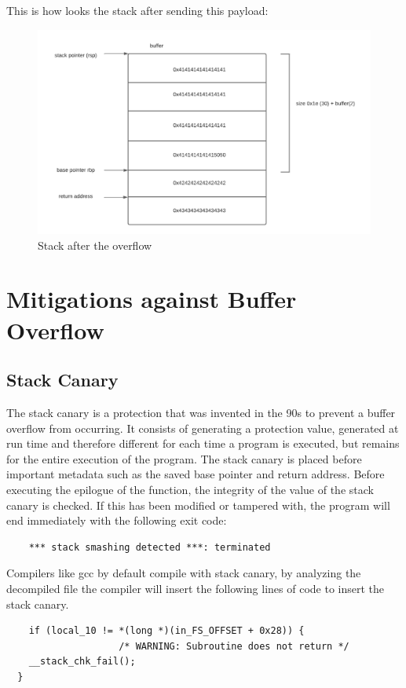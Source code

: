 \documentclass{report}
\begin{document}
    This is how looks the stack after sending this payload:
    \begin{figure}
        \centering
        \includegraphics[width=1\linewidth]{stack_after_overflow.png}
        \caption{Stack after the overflow}
        \label{fig:enter-label}
    \end{figure}
    \clearpage
    
    \chapter{Mitigations against Buffer Overflow}
    \section{Stack Canary}
    The stack canary is a protection that was invented in the 90s to prevent a buffer overflow from occurring.
    It consists of generating a protection value, generated at run time and therefore different for each time a program is executed, but remains for the entire execution of the program.
    The stack canary is placed before important metadata such as the saved base pointer and return address.
    Before executing the epilogue of the function, the integrity of the value of the stack canary is checked. If this has been modified or tampered with, the program will end immediately with the following exit code:
    \begin{verbatim}
    *** stack smashing detected ***: terminated
    \end{verbatim}
    
    Compilers like gcc by default compile with stack canary, by analyzing the decompiled file the compiler will insert the following lines of code to insert the stack canary.\newline
    \begin{verbatim}
    if (local_10 != *(long *)(in_FS_OFFSET + 0x28)) {
                    /* WARNING: Subroutine does not return */
    __stack_chk_fail();
  }
    \end{verbatim}
    
\end{document}
